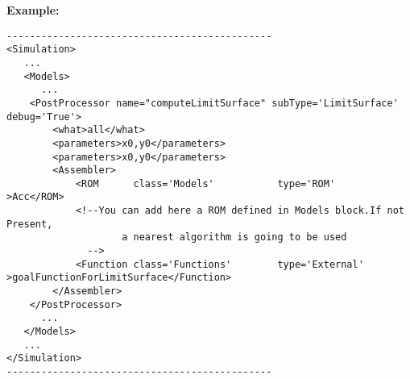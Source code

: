 \textbf{Example:}
\begin{lstlisting}[style=XML]
----------------------------------------------
<Simulation>
   ...
   <Models>
      ...
    <PostProcessor name="computeLimitSurface" subType='LimitSurface' debug='True'>
        <what>all</what>
        <parameters>x0,y0</parameters>
        <parameters>x0,y0</parameters>
        <Assembler>
            <ROM      class='Models'           type='ROM'             >Acc</ROM> 
            <!--You can add here a ROM defined in Models block.If not Present, 
                    a nearest algorithm is going to be used
              -->
            <Function class='Functions'        type='External'        >goalFunctionForLimitSurface</Function>
        </Assembler>
    </PostProcessor>
      ...
   </Models>
   ...
</Simulation>
----------------------------------------------
\end{lstlisting}

